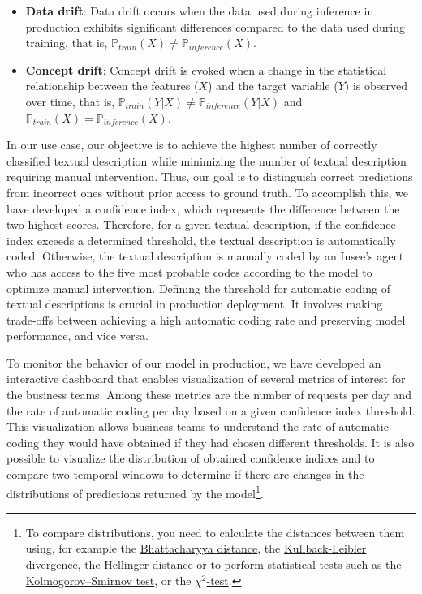 \begin{itemize}
    \item \textbf{Data drift}: Data drift occurs when the data used during inference in production exhibits significant differences compared to the data used during training, that is,  $\mathds{P}_{train}(X) \neq \mathds{P}_{inference}(X)$.
    \item \textbf{Concept drift}: Concept drift is evoked when a change in the statistical relationship between the features ($X$) and the target variable ($Y$) is observed over time, that is, $\mathds{P}_{train}(Y|X) \neq \mathds{P}_{inference}(Y|X)$ and $\mathds{P}_{train}(X) = \mathds{P}_{inference}(X)$.
\end{itemize}



In our use case, our objective is to achieve the highest number of correctly classified textual description while minimizing the number of textual description requiring manual intervention. Thus, our goal is to distinguish correct predictions from incorrect ones without prior access to ground truth. To accomplish this, we have developed a confidence index, which represents the difference between the two highest scores. Therefore, for a given textual description, if the confidence index exceeds a determined threshold, the textual description is automatically coded. Otherwise, the textual description is manually coded by an Insee's agent who has access to the five most probable codes according to the model to optimize manual intervention. Defining the threshold for automatic coding of textual descriptions is crucial in production deployment. It involves making trade-offs between achieving a high automatic coding rate and preserving model performance, and vice versa.

To monitor the behavior of our model in production, we have developed an interactive dashboard that enables visualization of several metrics of interest for the business teams. Among these metrics are the number of requests per day and the rate of automatic coding per day based on a given confidence index threshold. This visualization allows business teams to understand the rate of automatic coding they would have obtained if they had chosen different thresholds. It is also possible to visualize the distribution of obtained confidence indices and to compare two temporal windows to determine if there are changes in the distributions of predictions returned by the model\footnote{To compare distributions, you need to calculate the distances between them using, for example the \href{https://en.wikipedia.org/wiki/Bhattacharyya_distance}{Bhattacharyya distance}, the \href{https://en.wikipedia.org/wiki/Kullback\%E2\%80\%93Leibler_divergence}{Kullback-Leibler divergence}, the \href{https://en.wikipedia.org/wiki/Hellinger_distance}{Hellinger distance} or to perform statistical tests such as the \href{https://en.wikipedia.org/wiki/Kolmogorov\%E2\%80\%93Smirnov_test}{Kolmogorov–Smirnov test}, or the \href{https://en.wikipedia.org/wiki/Chi-squared_test}{$\chi^2$-test}.}. 

